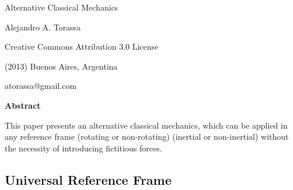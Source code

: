 \documentclass[10pt]{article}
\begin{document}
\begin{center}

{\huge Alternative Classical Mechanics}

\bigskip \bigskip

{\large Alejandro A. Torassa}

\bigskip \bigskip

\small

Creative Commons Attribution 3.0 License

(2013) Buenos Aires, Argentina

atorassa@gmail.com

\bigskip \medskip

{\bf Abstract}

\bigskip

\parbox{96mm}{This paper presents an alternative classical mechanics, which can be applied in any reference frame (rotating or non-rotating) (inertial or non-inertial) without the necessity of introducing fictitious forces.}

\end{center}

\normalsize

\vspace{-0.30em}

{\centering\subsection*{Universal Reference Frame}}

\vspace{+1.20em}
\end{document}
